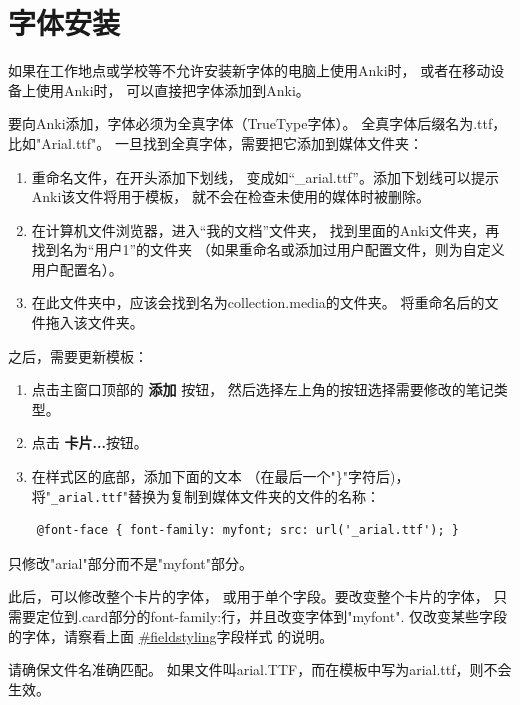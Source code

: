 \documentclass[a4paper]{book}
\begin{document}
	\section{字体安装}
	
	如果在工作地点或学校等不允许安装新字体的电脑上使用Anki时， 或者在移动设备上使用Anki时， 可以直接把字体添加到Anki。
	
	要向Anki添加，字体必须为全真字体（TrueType字体）。 全真字体后缀名为.ttf，比如"Arial.ttf"。 一旦找到全真字体，需要把它添加到媒体文件夹：
	
	\begin{enumerate}
		\item 重命名文件，在开头添加下划线， 变成如“\_arial.ttf”。添加下划线可以提示Anki该文件将用于模板， 就不会在检查未使用的媒体时被删除。
		\item 在计算机文件浏览器，进入“我的文档”文件夹， 找到里面的Anki文件夹，再找到名为“用户1”的文件夹 （如果重命名或添加过用户配置文件，则为自定义用户配置名）。
		\item 在此文件夹中，应该会找到名为collection.media的文件夹。 将重命名后的文件拖入该文件夹。
	\end{enumerate}
	
	之后，需要更新模板：
	\begin{enumerate}
		\item 点击主窗口顶部的 \textbf{添加} 按钮， 然后选择左上角的按钮选择需要修改的笔记类型。
		\item 点击 \textbf{卡片...}按钮。
		\item 在样式区的底部，添加下面的文本 （在最后一个"\}"字符后)， 将"\verb|_arial.ttf|"替换为复制到媒体文件夹的文件的名称：
\end{enumerate}

\begin{shaded}\begin{verbatim}
	@font-face { font-family: myfont; src: url('_arial.ttf'); }
	\end{verbatim}\end{shaded}


\begin{shaded}
	只修改"arial"部分而不是"myfont"部分。
\end{shaded}

此后，可以修改整个卡片的字体， 或用于单个字段。要改变整个卡片的字体， 只需要定位到.card部分的font-family:行，并且改变字体到"myfont". 仅改变某些字段的字体，请察看上面 \url{#fieldstyling}字段样式 的说明。


\begin{shaded}
	请确保文件名准确匹配。 如果文件叫arial.TTF，而在模板中写为arial.ttf，则不会生效。
\end{shaded}
\end{document}
